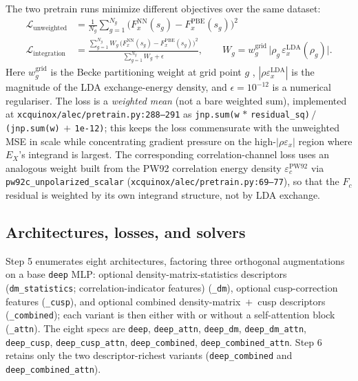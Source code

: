 \documentclass[11pt,letterpaper]{article}
\begin{document}
The two pretrain runs minimize different objectives over the same dataset:
\begin{align}
\mathcal{L}_{\text{unweighted}} &= \tfrac{1}{N_g} \sum_{g=1}^{N_g} \big(F_x^{\text{NN}}(s_g) - F_x^{\text{PBE}}(s_g)\big)^2 \\
\mathcal{L}_{\text{integration}} &= \frac{\sum_{g=1}^{N_g} W_g\,
   \big(F_x^{\text{NN}}(s_g) - F_x^{\text{PBE}}(s_g)\big)^2}
   {\sum_{g=1}^{N_g} W_g + \epsilon},
\qquad W_g = w_g^{\text{grid}}\,
   \big|\rho_g\, \varepsilon_x^{\text{LDA}}(\rho_g)\big| .
\end{align}
Here $w_g^{\text{grid}}$ is the Becke partitioning weight at grid point $g$
\citep{Becke1988}, $|\rho \varepsilon_x^{\text{LDA}}|$ is the magnitude of the LDA
exchange-energy density, and $\epsilon = 10^{-12}$ is a numerical regulariser. The
loss is a \emph{weighted mean} (not a bare weighted sum), implemented at
\texttt{xcquinox/alec/pretrain.py:288--291} as
\texttt{jnp.sum(w$\,*\,$residual\_sq)$\,/\,$(jnp.sum(w)$\,+\,$1e-12)}; this keeps the
loss commensurate with the unweighted MSE in scale while concentrating gradient
pressure on the high-$|\rho \varepsilon_x|$ region where $E_X$'s integrand is largest.
The corresponding correlation-channel loss uses an analogous weight built from the
PW92 correlation energy density $\varepsilon_c^{\mathrm{PW92}}$ \citep{PerdewWang1992}
via \texttt{pw92c\_unpolarized\_scalar} (\texttt{xcquinox/alec/pretrain.py:69--77}),
so that the $F_c$ residual is weighted by its own integrand structure, not by LDA
exchange.

\subsection{Architectures, losses, and solvers}
\label{sec:methods_arch_loss}

Step 5 enumerates eight architectures, factoring three orthogonal
augmentations on a base \texttt{deep} MLP: optional
density-matrix-statistics descriptors (\texttt{dm\_statistics};
correlation-indicator features) (\texttt{\_dm}), optional cusp-correction features
(\texttt{\_cusp}), and optional combined density-matrix~$+$~cusp
descriptors (\texttt{\_combined}); each variant is then either with or
without a self-attention block (\texttt{\_attn}). The eight specs are
\texttt{deep}, \texttt{deep\_attn}, \texttt{deep\_dm},
\texttt{deep\_dm\_attn}, \texttt{deep\_cusp}, \texttt{deep\_cusp\_attn},
\texttt{deep\_combined}, \texttt{deep\_combined\_attn}. Step 6 retains
only the two descriptor-richest variants
(\texttt{deep\_combined} and \texttt{deep\_combined\_attn}).
\end{document}
